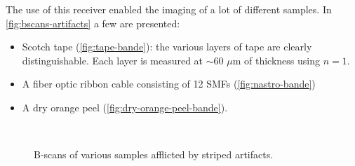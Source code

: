 The use of this receiver enabled the imaging of a lot of different samples. In \autoref{fig:bscans-artifacts} a few are presented:
\begin{itemize}
	\item Scotch tape (\autoref{fig:tape-bande}): the various layers of tape are clearly distinguishable. Each layer is measured at $\sim 60$ $\mu$m of thickness using $n=1$. 
		\item A fiber optic ribbon cable consisting of 12 \acp{SMF} (\autoref{fig:nastro-bande})
		
	\item A dry orange peel (\autoref{fig:dry-orange-peel-bande}). 
	
	
\end{itemize} 

\begin{figure}[bth]
	\myfloatalign
	\\
	 \quad
	\caption{B-scans of various samples afflicted by striped artifacts.}\label{fig:bscans-artifacts}
\end{figure}



